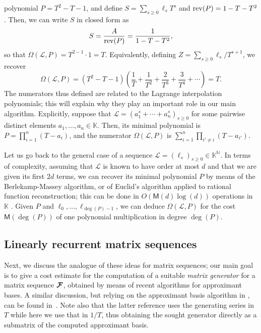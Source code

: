 \documentclass[12pt]{article}
\newcommand{\var}{T} %
\newcommand{\mat}[1]{\bm{\MakeUppercase{#1}}} %
\newcommand{\seq}{\mat{\mathcal{F}}} %
\newcommand{\genseries}{Z}
\newcommand{\minpoly}{P}
\def\M {\ensuremath{\mathsf{M}}}
\def\N {\ensuremath{\mathbb{N}}}
\def\K{\mathbb{K}}
\def\K {\ensuremath{\mathbb{K}}}
\begin{document}
polynomial $P=T^2-T-1$, and define $S= \sum_{s\ge 0} \ell_{s} T^s$ and
${\rm rev}(P) = 1-T-T^2$. Then, we can write $S$ in closed form as
$$S = \frac{A}{{\rm rev}(P)} = \frac{1}{1-T-T^2},$$
so that $\Omega(\mathcal{L},P)=T^{2-1} \cdot 1=T$. Equivalently, defining
$\genseries = \sum_{s\ge0} \ell_{s}/T^{s+1}$, we recover 
\[
  \Omega(\mathcal{L},P) = (T^2-T-1)\left (\frac 1T +\frac 1{T^2} + \frac
  2{T^3} + \frac 3{T^4} + \cdots \right ) =T.
\]
The numerators thus defined are related to the Lagrange interpolation
polynomials; this will explain why they play an important role in our main
algorithm. Explicitly, suppose that $\mathcal{L} = (a_1^s + \cdots + a_n^s)_{s
\ge 0}$ for some pairwise distinct elements $a_1,\dots,a_n \in \K$. Then, its
minimal polynomial is $\minpoly=\prod_{i=1}^n (T-a_i)$, and the numerator
 $\Omega(\mathcal{L}, P)$ is  $ \sum_{i=1}^n \prod_{i'\ne i} (T-a_{i'})$.

Let us go back to the general case of a sequence $\mathcal{L}
=(\ell_s)_{s\ge0}\in\K^\N$.  In terms of complexity, assuming that
$\mathcal{L}$ is known to have order at most $d$ and that we are given its
first $2d$ terms, we can recover its minimal polynomial $P$ by means of the
Berlekamp-Massey algorithm, or of Euclid's algorithm applied to rational
function reconstruction; this can be done in $O(\M(d)\log(d))$ operations in
$\K$ \cite{BrGuYu80}. Given $P$ and $\ell_0,\dots,\ell_{\deg(P)-1}$, we can
deduce $\Omega(\mathcal{L},P)$ for the cost $\M(\deg(P))$ of one polynomial
multiplication in degree $\deg(P)$.



\subsection{Linearly recurrent matrix sequences}\label{section:matrix_seq}

Next, we discuss the analogue of these ideas for matrix sequences; our main
goal is to give a cost estimate for the computation of a suitable {\em matrix
generator} for a matrix sequence $\seq$, obtained by means of recent algorithms
for approximant bases. A similar discussion, but relying on the approximant
basis algorithm in \cite{BecLab94}, can be found in~\cite[Chapter~4]{Turner02}.
Note also that the latter reference uses the generating series in $\var$ while
here we use that in $1/\var$, thus obtaining the sought generator directly as a
submatrix of the computed approximant basis.
\end{document}

